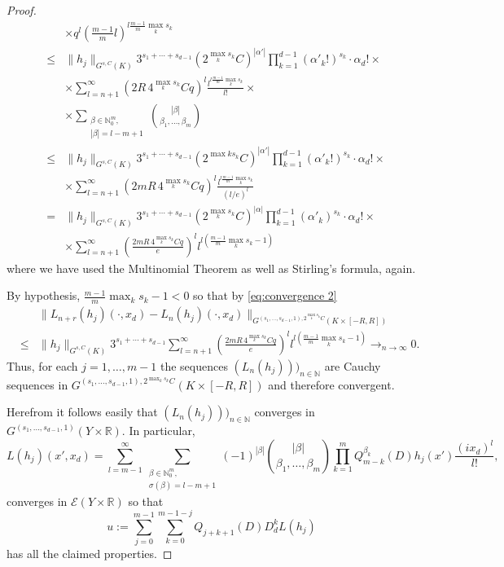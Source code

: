 \documentclass[a4paper,10pt]{amsart}
\newtheorem*{crucial lemma}{Lemma \ref{lem:nice polynomial2}}
\theoremstyle{definition}
\newcommand{\R}{\mathbb{R}}
\newcommand{\N}{\mathbb{N}}
\begin{document}
\begin{proof}
\begin{eqnarray}
		&&\times q^l\left(\frac{m-1}{m} l\right)^{l \frac{m-1}{m} \max_k s_k}\nonumber\\ 
		&\leq&  \|h_j\|_{G^{s,C}(K)} 3^{s_1+\cdots +s_{d-1}}\left(2^{\max_k s_k}C\right)^{|\alpha'|}\prod_{k=1}^{d-1}(\alpha'_k!)^{s_k}\cdot\alpha_d!\times\nonumber\\
		&&\times\sum_{l=n+1}^\infty  \left(2R\,4^{\max_k s_k} C q \right)^l\frac{l^{l\frac{m-1}{m}\max_k s_k}}{l!} \times\nonumber\\
		&&\times \sum\limits_{\substack{\beta\in\N_0^m,\\ |\beta|=l-m+1}}\binom{|\beta|}{\beta_1,\ldots,\beta_m} \nonumber\\
		&\leq&  \|h_j\|_{G^{s,C}(K)} 3^{s_1+\cdots +s_{d-1}}\left(2^{\max k s_k}C\right)^{|\alpha'|}\prod_{k=1}^{d-1}(\alpha'_k!)^{s_k}\cdot\alpha_d!\times\nonumber\\
		&&\times\sum_{l=n+1}^\infty  \left(2mR\,4^{\max_k s_k} C q \right)^l\frac{l^{l\frac{m-1}{m}\max_k s_k}}{(l/e)^l}\nonumber\\
		&=& \|h_j\|_{G^{s,C}(K)} 3^{s_1+\cdots +s_{d-1}}\left(2^{\max_k s_k}C\right)^{|\alpha|}\prod_{k=1}^{d-1}(\alpha'_k)^{s_k}\cdot\alpha_d!\times\nonumber\\
		&&\times\sum_{l=n+1}^\infty  \left(\frac{2mR\,4^{\max_k s_k} C q}{e} \right)^l l^{l(\frac{m-1}{m}\max_k s_k-1)}
	\end{eqnarray}
	where we have used the Multinomial Theorem as well as Stirling's formula, again.
	
	By hypothesis, $\frac{m-1}{m}\max_k s_k-1<0$ so that by \eqref{eq:convergence 2}
	\begin{eqnarray*}
		&&\|L_{n+r}(h_j)(\cdot, x_d)-L_n(h_j)(\cdot,x_d)\|_{G^{(s_1,\ldots,s_{d-1},1), 2^{\max_k s_k}C}(K\times[-R,R])}\\
		&\leq &  \|h_j\|_{G^{s,C}(K)}3^{s_1+\cdots+s_{d-1}} \sum_{l=n+1}^\infty\left(\frac{2mR\,4^{\max_k s_k} C q}{e} \right)^l l^{l(\frac{m-1}{m}\max_k s_k-1)}\rightarrow_{n\rightarrow\infty}0.
	\end{eqnarray*}
	Thus, for each $j=1,\ldots,m-1$ the sequences $(L_n(h_j)))_{n\in\N}$ are Cauchy sequences in $G^{(s_1,\ldots,s_{d-1},1),2^{\max_k s_k}C}(K\times[-R,R])$ and therefore convergent.
	
	Herefrom it follows easily that $(L_n(h_j)))_{n\in\N}$ converges in $G^{(s_1,\ldots,s_{d-1},1)}(Y\times\R)$. In particular,
	\[L(h_j)(x',x_d)=\sum_{l=m-1}^\infty \sum\limits_{\substack{\beta\in\N_0^m,\\ \sigma(\beta)=l-m+1}}(-1)^{|\beta|}\binom{|\beta|}{\beta_1,\ldots,\beta_m}\prod_{k=1}^m Q_{m-k}^{\beta_k}(D)h_j(x') \frac{(ix_d)^l}{l!},\]
	converges in $\mathscr{E}(Y\times\R)$ so that
	\[u:=\sum_{j=0}^{m-1}\sum_{k=0}^{m-1-j}Q_{j+k+1}(D)D_d^kL(h_j)\]
	has all the claimed properties.
	

\end{proof}
\end{document}
